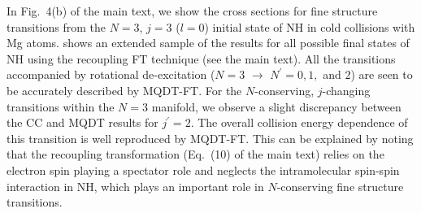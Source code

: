 \documentclass[reprint,amssymb,noeprint,twocolumn,longbibliography]{revtex4-2}
\begin{document}
In Fig.~4(b) of the main text, we show the cross sections for fine structure  transitions from the $N=3$, $j=3$ ($l=0$) initial state of NH in cold collisions with Mg atoms.
 shows an extended sample of the results for all possible final states of NH using the recoupling FT technique (see the main text). All the transitions accompanied by rotational de-excitation ($N=3$ $\to$ $N^\prime=0,1,$ and $2$) are seen to be accurately described by MQDT-FT. For the $N$-conserving, $j$-changing transitions within the $N=3$ manifold, we observe a slight discrepancy between the CC and MQDT results for $j^\prime=2$. The overall collision energy dependence of this transition is well reproduced by MQDT-FT. 
This can be explained by noting that the recoupling transformation (Eq.~(10) of the main text) relies on the electron spin playing a spectator role and neglects the intramolecular spin-spin interaction in NH, which plays an important role in $N$-conserving fine structure transitions. 





\end{document}
